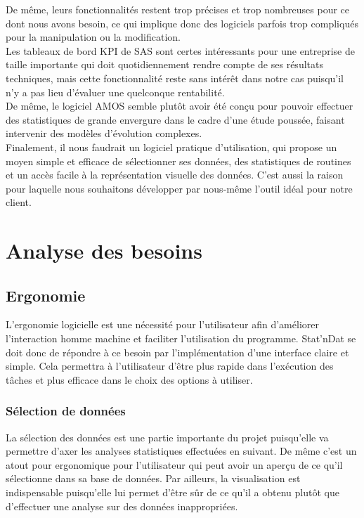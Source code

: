 \documentclass[a4paper,10pt]{report}
\begin{document}
De même, leurs fonctionnalités restent trop précises et trop nombreuses pour ce dont nous avons besoin, ce qui implique donc des logiciels parfois trop compliqués pour la manipulation ou la modification. \\

Les tableaux de bord KPI de SAS sont certes intéressants pour une entreprise de taille importante qui doit quotidiennement rendre compte de ses résultats techniques, mais cette fonctionnalité reste sans intérêt dans notre cas puisqu’il n’y a pas lieu d’évaluer une quelconque rentabilité.\\

De même, le logiciel AMOS semble plutôt avoir été conçu pour pouvoir effectuer des statistiques de grande envergure dans le cadre d’une étude poussée, faisant intervenir des modèles d’évolution complexes.\\

Finalement, il nous faudrait un logiciel pratique d’utilisation, qui propose un moyen simple et efficace de sélectionner ses données, des statistiques de routines et un accès facile à la représentation visuelle des données. C’est aussi la raison pour laquelle nous souhaitons développer par nous-même l’outil idéal pour notre client.

\section{Analyse des besoins}

\subsection{Ergonomie}

L’ergonomie logicielle est une nécessité pour l’utilisateur afin d’améliorer l’interaction homme machine et faciliter l’utilisation du programme. Stat’nDat se doit donc de répondre à ce besoin par l’implémentation d’une interface claire et simple. Cela permettra à l’utilisateur d’être plus rapide dans l’exécution des tâches et plus efficace dans le choix des options à utiliser. 

\subsubsection{Sélection de données}

La sélection des données est une partie importante du projet puisqu’elle va permettre d’axer les analyses statistiques effectuées en suivant. De même c’est un atout pour ergonomique pour l’utilisateur qui peut avoir un aperçu de ce qu’il sélectionne dans sa base de données. Par ailleurs, la visualisation est indispensable puisqu’elle lui permet d’être sûr de ce qu’il a obtenu plutôt que d’effectuer une analyse sur des données inappropriées. \\
\end{document}
